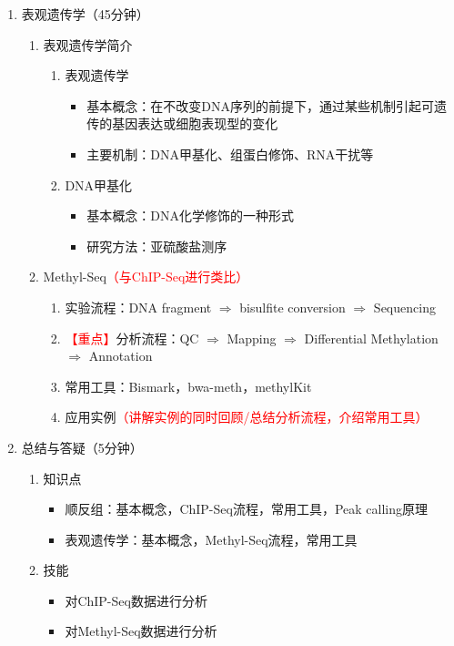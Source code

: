 \documentclass{TIJMUjiaoanLL}
\begin{document}
\begin{enumerate}
  \item 表观遗传学（45分钟）
    \begin{enumerate}
      \item 表观遗传学简介
        \begin{enumerate}
          \item 表观遗传学
            \begin{itemize}
              \item 基本概念：在不改变DNA序列的前提下，通过某些机制引起可遗传的基因表达或细胞表现型的变化
              \item 主要机制：DNA甲基化、组蛋白修饰、RNA干扰等
            \end{itemize}
          \item DNA甲基化
            \begin{itemize}
              \item 基本概念：DNA化学修饰的一种形式
              \item 研究方法：亚硫酸盐测序
            \end{itemize}
        \end{enumerate}
      \item Methyl-Seq\textcolor{red}{（与ChIP-Seq进行类比）}
        \begin{enumerate}
          \item 实验流程：DNA fragment $\Rightarrow$ bisulfite conversion $\Rightarrow$ Sequencing
          \item \textcolor{red}{【重点】}分析流程：QC $\Rightarrow$ Mapping $\Rightarrow$ Differential Methylation $\Rightarrow$ Annotation
          \item 常用工具：Bismark，bwa-meth，methylKit
          \item 应用实例\textcolor{red}{（讲解实例的同时回顾/总结分析流程，介绍常用工具）}
        \end{enumerate}
    \end{enumerate}

\otherTail
\newpage
\otherHeader

  \item 总结与答疑（5分钟）
    \begin{enumerate}
      \item 知识点
	\begin{itemize}
    \item 顺反组：基本概念，ChIP-Seq流程，常用工具，Peak calling原理
    \item 表观遗传学：基本概念，Methyl-Seq流程，常用工具
	\end{itemize}
      \item 技能
	\begin{itemize}
    \item 对ChIP-Seq数据进行分析
    \item 对Methyl-Seq数据进行分析
	\end{itemize}
    \end{enumerate}
\end{enumerate}

\otherTail
\end{document}
